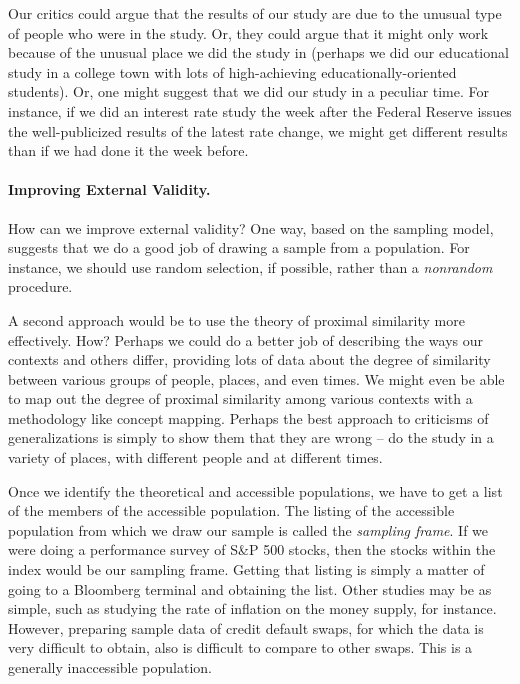 Our critics could argue that the results of our study are due to the unusual type of people who were in the study. Or, they could argue that it might only work because of the unusual place we did the study in (perhaps we did our educational study in a college town with lots of high-achieving educationally-oriented students). Or, one might suggest that we did our study in a peculiar time. For instance, if we did an interest rate study the week after the Federal Reserve issues the well-publicized results of the latest rate change, we might get different results than if we had done it the week before.

\paragraph{Improving External Validity.}
How can we improve external validity? One way, based on the sampling model, suggests that we do a good job of drawing a sample from a population. For instance, we should use random selection, if possible, rather than a \emph{nonrandom} procedure.

A second approach would be to use the theory of proximal similarity more effectively. How? Perhaps we could do a better job of describing the ways our contexts and others differ, providing lots of data about the degree of similarity between various groups of people, places, and even times. We might even be able to map out the degree of proximal similarity among various contexts with a methodology like concept mapping. Perhaps the best approach to criticisms of generalizations is simply to show them that they are wrong -- do the study in a variety of places, with different people and at different times.

Once we identify the theoretical and accessible populations, we have to get a list of the members of the accessible population. The listing of the accessible population from which we draw our sample is called the \emph{sampling frame}. If we were doing a performance survey of S\&P 500 stocks, then the stocks within the index would be our sampling frame. Getting that listing is simply a matter of going to a Bloomberg terminal
and obtaining the list. Other studies may be as simple, such as studying the rate of inflation on the money supply, for instance. However, preparing sample data of credit default swaps, for which the data is very difficult to obtain, also is difficult to compare to other swaps. This is a generally inaccessible population.

